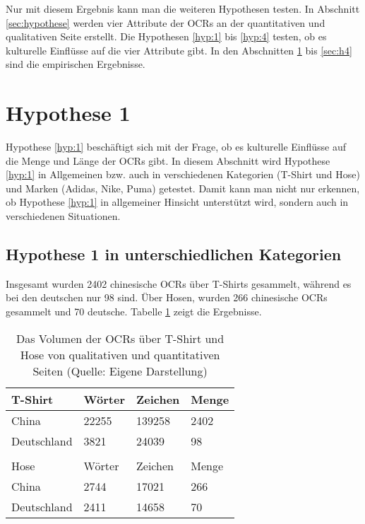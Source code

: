 Nur mit diesem Ergebnis kann man die weiteren Hypothesen testen. In Abschnitt \ref{sec:hypothese} werden vier Attribute der \ac{OCRs} an der quantitativen und qualitativen Seite erstellt. Die Hypothesen \ref{hyp:1} bis \ref{hyp:4} testen, ob es kulturelle Einflüsse auf die vier Attribute gibt. In den Abschnitten \ref{sec:h1} bis \ref{sec:h4} sind die empirischen Ergebnisse.
\section{Hypothese 1} \label{sec:h1}
Hypothese \ref{hyp:1} beschäftigt sich mit der Frage, ob es kulturelle Einflüsse auf die Menge und Länge der \ac{OCRs} gibt. In diesem Abschnitt wird Hypothese \ref{hyp:1} in Allgemeinen \ac{bzw.} auch in verschiedenen Kategorien (T-Shirt und Hose) und Marken (Adidas, Nike, Puma) getestet. Damit kann man nicht nur erkennen, ob Hypothese \ref{hyp:1} in allgemeiner Hinsicht unterstützt wird, sondern auch in verschiedenen Situationen.
\subsection{Hypothese 1 in unterschiedlichen Kategorien}
Insgesamt wurden 2402 chinesische \ac{OCRs} über T-Shirts gesammelt, während es bei den deutschen nur 98 sind. Über Hosen, wurden 266 chinesische \ac{OCRs} gesammelt und 70 deutsche. Tabelle \ref{tab:volumenTshirtHose} zeigt die Ergebnisse.
\begin{table}[htb]
\centering
\begin{tabular}{|llll|}
\hline
\multicolumn{1}{|l|}{T-Shirt}     & \multicolumn{1}{l|}{Wörter} & \multicolumn{1}{l|}{Zeichen} & Menge \\ \hline
\multicolumn{1}{|l|}{China}       & \multicolumn{1}{l|}{22255}  & \multicolumn{1}{l|}{139258}  & 2402   \\ \hline
\multicolumn{1}{|l|}{Deutschland} & \multicolumn{1}{l|}{3821}   & \multicolumn{1}{l|}{24039}   & 98     \\ \hline
                                  &                             &                              &        \\ \hline
\multicolumn{1}{|l|}{Hose}        & \multicolumn{1}{l|}{Wörter} & \multicolumn{1}{l|}{Zeichen} & Menge \\ \hline
\multicolumn{1}{|l|}{China}       & \multicolumn{1}{l|}{2744}   & \multicolumn{1}{l|}{17021}   & 266   \\ \hline
\multicolumn{1}{|l|}{Deutschland} & \multicolumn{1}{l|}{2411}   & \multicolumn{1}{l|}{14658}   & 70     \\ \hline
\end{tabular}
\caption[Das Volumen der OCRs über T-Shirt und Hose von qualitativen und quantitativen Seiten]{Das Volumen der \ac{OCRs} über T-Shirt und Hose von qualitativen und quantitativen Seiten (Quelle: Eigene Darstellung)}
\label{tab:volumenTshirtHose}
\end{table}


